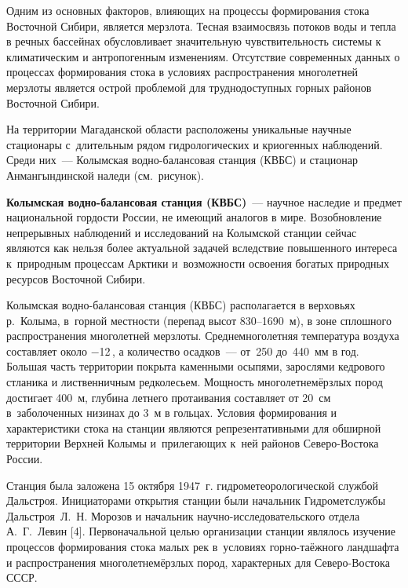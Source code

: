  

\makeProcTitle
{}

Одним из основных факторов, влияющих на процессы формирования стока Восточной Сибири, является мерзлота. Тесная взаимосвязь потоков воды и тепла в речных бассейнах обусловливает значительную чувствительность системы к климатическим и антропогенным изменениям. Отсутствие современных данных о процессах формирования стока в условиях распространения многолетней мерзлоты является острой проблемой для труднодоступных горных районов Восточной Сибири.

На территории Магаданской области расположены уникальные научные стационары с~длительным рядом гидрологических и криогенных наблюдений. Среди них~--- Колымская водно-балансовая станция (КВБС) и стационар Анмангындинской наледи (см.~рисунок).



\textbf{Колымская водно-балансовая станция (КВБС)}~--- научное наследие и предмет национальной гордости России, не имеющий аналогов в мире. Возобновление непрерывных наблюдений и исследований на Колымской станции сейчас являются как нельзя более актуальной задачей вследствие повышенного интереса к~природным процессам Арктики и~возможности освоения богатых природных ресурсов Восточной Сибири.

Колымская водно-балансовая станция (КВБС) располагается в верховьях р.~Колыма, в~горной местности (перепад высот 830--1690~м), в зоне сплошного распространения многолетней мерзлоты. Среднемноголетняя температура воздуха составляет около $-$12\,, а количество осадков~--- от~250 до~440~мм в год. Большая часть территории покрыта каменными осыпями, зарослями кедрового стланика и лиственничным редколесьем. Мощность многолетнемёрзлых пород достигает 400~м, глубина летнего протаивания составляет от 20~см в~заболоченных низинах до 3~м в гольцах. Условия формирования и характеристики стока на станции являются репрезентативными для обширной территории Верхней Колымы и~прилегающих к~ней районов Северо-Востока России.

Станция была заложена 15 октября 1947~г. гидрометеорологической службой Дальстроя. Инициаторами открытия станции были начальник Гидрометслужбы Дальстроя~Л.~Н. Морозов и начальник научно-ис\-сле\-до\-ва\-тель\-ско\-го отдела А.~Г.~Левин [4]. Первоначальной целью организации станции являлось изучение процессов формирования стока малых рек в~условиях горно-таёжного ландшафта и распространения многолетнемёрзлых пород, характерных для Северо-Востока СССР.


